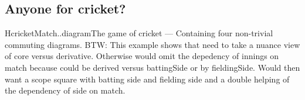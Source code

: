 \subsection{Anyone for cricket?}

\begin{erboxedFigure}{H}{cricketMatch..diagram}{The game of cricket --- Containing four non-trivial commuting diagrams. BTW: This example shows that need to take a nuance view of core versus derivative. Otherwise would omit the depedency of innings on match
because could be derived versus battingSide or by fieldingSide. Would then want a scope square with batting side and fielding side and a double helping of the dependency of side on match.}

\end{erboxedFigure}

